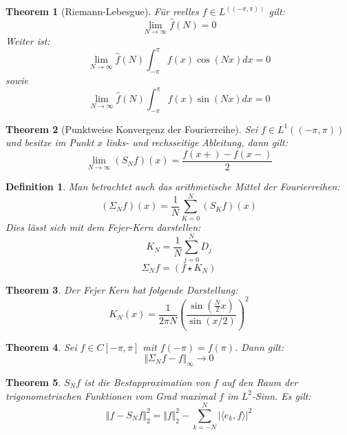 \documentclass[10pt,a4paper]{article}
\newtheorem{theorem}{Theorem}
\newtheorem{definition}{Definition}
\begin{document}
\begin{theorem}[Riemann-Lebesgue]
	Für reelles $f\in L^((-\pi, \pi))$ gilt:
	$$\lim_{N\to\infty}\hat{f}(N) =0$$
	Weiter ist:
	$$\lim_{N\to\infty}\hat{f}(N)\int_{-\pi}^\pi f(x) \cos(Nx)dx= 0$$
	sowie
	$$\lim_{N\to\infty}\hat{f}(N)\int_{-\pi}^\pi f(x) \sin(Nx)dx= 0$$
\end{theorem}
\begin{theorem}[Punktweise Konvergenz der Fourierreihe]
	Sei $f\in L^1((-\pi, \pi))$ und besitze im Punkt $x$ links- und rechsseitige Ableitung, dann gilt:
	$$\lim_{N\to\infty}(S_Nf)(x) = \frac{f(x+)- f(x-)}{2}$$
\end{theorem}
\begin{definition}
	Man betrachtet auch das arithmetische Mittel der Fourierreihen:
	$$(\Sigma_Nf)(x) = \frac{1}{N}\sum_{K=0}^{N}(S_Kf)(x)$$
	Dies lässt sich mit dem Fejer-Kern darstellen:
	$$K_N = \frac{1}{N}\sum_{j=0}^{N}D_j$$
	$$\Sigma_Nf = (f\star K_N)$$
\end{definition}
\begin{theorem}
	Der Fejer Kern hat folgende Darstellung:
		$$K_N(x) =
			\frac{1}{2\pi N}(\frac{\sin(\frac{N}{2}x)}{\sin(x/2)})^2 $$
\end{theorem}
\begin{theorem}
	Sei $f\in C[-\pi, \pi]$ mit $f(-\pi) = f(\pi)$. Dann gilt: 
	$$\Vert \Sigma_Nf - f\Vert_\infty \to 0$$
\end{theorem}
\begin{theorem}
	$S_N f$ ist die Bestapproximation von $f$ auf den Raum der trigonometrischen Funktionen vom Grad maximal $f$ im $L^2$-Sinn. Es gilt:
	$$\Vert f - S_Nf\Vert_2^2  = \Vert f\Vert_2^2 -\sum_{k=-N}^{N}|\langle e_k, f\rangle|^2 $$
\end{theorem}
\end{document}
